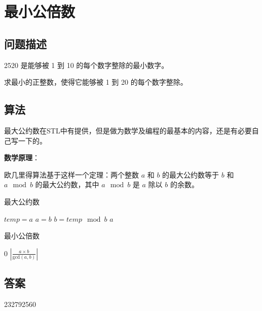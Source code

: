 \section{最小公倍数}
\subsection{问题描述}
\begin{tcolorbox}
	2520 是能够被 1 到 10 的每个数字整除的最小数字。

	求最小的正整数，使得它能够被 1 到 20 的每个数字整除。
\end{tcolorbox}

\subsection{算法}
最大公约数在STL中有提供，但是做为数学及编程的最基本的内容，还是有必要自己写一下的。

\textbf{数学原理}：

欧几里得算法基于这样一个定理：两个整数  $ a $  和  $ b $  的最大公约数等于  $b$  和 \( a \mod b \) 的最大公约数，其中 \(
a \mod b \) 是  $a$  除以  $b$  的余数。

\begin{algorithm}
	\caption{最大公约数}
	\begin{algorithmic}[1]
		\State $ temp = a$
		\State $ a = b$
		\State $ b = temp \mod b$
		\EndWhile
		\Return $a$
		\EndFunction
	\end{algorithmic}
\end{algorithm}

\begin{algorithm}
	\caption{最小公倍数}
	\begin{algorithmic}[1]
				\Return $0$
			\EndIf
			\Return $\left|\frac{a \times b}{\text{gcd}(a,b)}\right|$
		\EndFunction
	\end{algorithmic}
\end{algorithm}

\subsection{答案}
232792560
